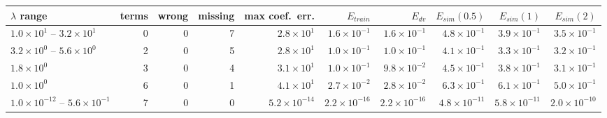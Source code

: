 \begin{tabular}{lrrrrrrrrr}\toprule
$\lambda$ range & terms & wrong & missing & max coef.\ err. & $E_{train}$ & $E_{dv}$ & $E_{sim}(0.5)$ & $E_{sim}(1)$ & $E_{sim}(2)$\\\midrule
$1.0\!\times\!10^{1}$ -- $3.2\!\times\!10^{1}$ & 0 & 0 & 7 & $2.8\!\times\!10^{1}$ & $1.6\!\times\!10^{-1}$ & $1.6\!\times\!10^{-1}$ & $4.8\!\times\!10^{-1}$ & $3.9\!\times\!10^{-1}$ & $3.5\!\times\!10^{-1}$\\
$3.2\!\times\!10^{0}$ -- $5.6\!\times\!10^{0}$ & 2 & 0 & 5 & $2.8\!\times\!10^{1}$ & $1.0\!\times\!10^{-1}$ & $1.0\!\times\!10^{-1}$ & $4.1\!\times\!10^{-1}$ & $3.3\!\times\!10^{-1}$ & $3.2\!\times\!10^{-1}$\\
$1.8\!\times\!10^{0}$ & 3 & 0 & 4 & $3.1\!\times\!10^{1}$ & $1.0\!\times\!10^{-1}$ & $9.8\!\times\!10^{-2}$ & $4.5\!\times\!10^{-1}$ & $3.8\!\times\!10^{-1}$ & $3.1\!\times\!10^{-1}$\\
$1.0\!\times\!10^{0}$ & 6 & 0 & 1 & $4.1\!\times\!10^{1}$ & $2.7\!\times\!10^{-2}$ & $2.8\!\times\!10^{-2}$ & $6.3\!\times\!10^{-1}$ & $6.1\!\times\!10^{-1}$ & $5.0\!\times\!10^{-1}$\\
\rowcolor{sel}$1.0\!\times\!10^{-12}$ -- $5.6\!\times\!10^{-1}$ & 7 & 0 & 0 & $5.2\!\times\!10^{-14}$ & $2.2\!\times\!10^{-16}$ & $2.2\!\times\!10^{-16}$ & $4.8\!\times\!10^{-11}$ & $5.8\!\times\!10^{-11}$ & $2.0\!\times\!10^{-10}$\\
\bottomrule\end{tabular}